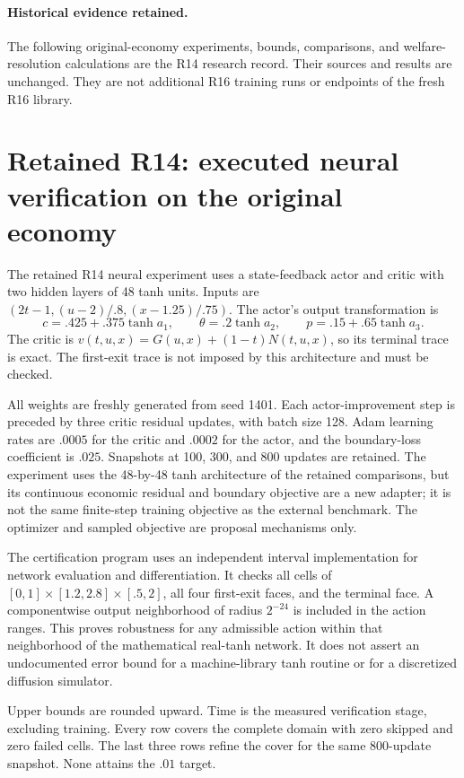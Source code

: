 \paragraph{Historical evidence retained.} The following original-economy experiments, bounds, comparisons, and welfare-resolution calculations are the R14 research record. Their sources and results are unchanged. They are not additional R16 training runs or endpoints of the fresh R16 library.
\section{Retained R14: executed neural verification on the original economy}\label{sec:neural}
The retained R14 neural experiment uses a state-feedback actor and critic with two hidden layers of 48 tanh units. Inputs are $(2t-1,(u-2)/.8,(x-1.25)/.75)$. The actor's output transformation is
\[
 c=.425+.375\tanh a_1,\qquad
 \theta=.2\tanh a_2,\qquad
 p=.15+.65\tanh a_3.
\]
The critic is $v(t,u,x)=G(u,x)+(1-t)N(t,u,x)$, so its terminal trace is exact. The first-exit trace is not imposed by this architecture and must be checked.

All weights are freshly generated from seed 1401. Each actor-improvement step is preceded by three critic residual updates, with batch size 128. Adam learning rates are $.0005$ for the critic and $.0002$ for the actor, and the boundary-loss coefficient is $.025$. Snapshots at 100, 300, and 800 updates are retained. The experiment uses the 48-by-48 tanh architecture of the retained comparisons, but its continuous economic residual and boundary objective are a new adapter; it is not the same finite-step training objective as the external benchmark. The optimizer and sampled objective are proposal mechanisms only.

The certification program uses an independent interval implementation for network evaluation and differentiation. It checks all cells of $[0,1]\times[1.2,2.8]\times[.5,2]$, all four first-exit faces, and the terminal face. A componentwise output neighborhood of radius $2^{-24}$ is included in the action ranges. This proves robustness for any admissible action within that neighborhood of the mathematical real-tanh network. It does not assert an undocumented error bound for a machine-library tanh routine or for a discretized diffusion simulator.

\begin{table}[t]\centering\small
\caption{Whole-domain neural certificates on the unchanged economy, $k=2$}\label{tab:neural}

\par\smallskip\footnotesize Upper bounds are rounded upward. Time is the measured verification stage, excluding training. Every row covers the complete domain with zero skipped and zero failed cells. The last three rows refine the cover for the same 800-update snapshot. None attains the $.01$ target.
\end{table}

